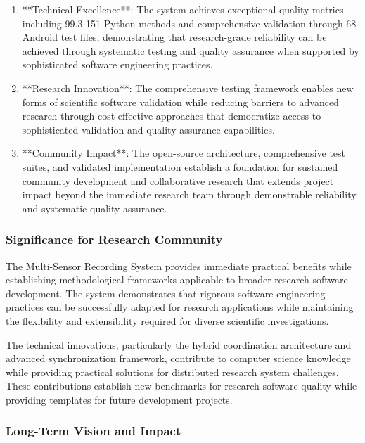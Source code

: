\documentclass[12pt,a4paper]{article}
\begin{document}
\begin{enumerate}
\item **Technical Excellence**: The system achieves exceptional quality metrics including 99.3%
   151 Python methods and comprehensive validation through 68 Android test files, demonstrating that research-grade 
   reliability can be achieved through systematic testing and quality assurance when supported by sophisticated 
   software engineering practices.

\item **Research Innovation**: The comprehensive testing framework enables new forms of scientific software validation 
   while reducing barriers to advanced research through cost-effective approaches that democratize access to 
   sophisticated validation and quality assurance capabilities.

\item **Community Impact**: The open-source architecture, comprehensive test suites, and validated implementation 
   establish a foundation for sustained community development and collaborative research that extends project impact 
   beyond the immediate research team through demonstrable reliability and systematic quality assurance.

\end{enumerate}
\subsubsection{Significance for Research Community}

The Multi-Sensor Recording System provides immediate practical benefits while establishing methodological frameworks
applicable to broader research software development. The system demonstrates that rigorous software engineering
practices can be successfully adapted for research applications while maintaining the flexibility and extensibility
required for diverse scientific investigations.

The technical innovations, particularly the hybrid coordination architecture and advanced synchronization framework,
contribute to computer science knowledge while providing practical solutions for distributed research system challenges.
These contributions establish new benchmarks for research software quality while providing templates for future
development projects.

\subsubsection{Long-Term Vision and Impact}
\end{document}
